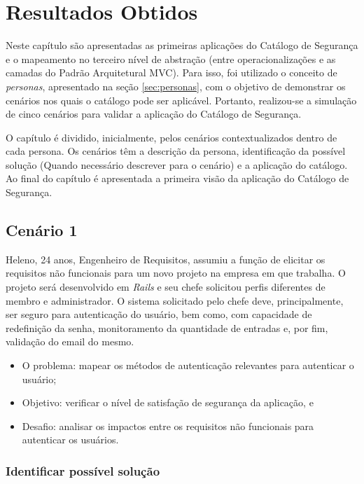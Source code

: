 \chapter{Resultados Obtidos}
\label{chap:resultadosObtidos}

Neste capítulo são apresentadas as primeiras aplicações do Catálogo de Segurança e o mapeamento no terceiro nível de abstração (entre operacionalizações e as camadas do Padrão Arquitetural MVC). Para isso, foi utilizado o conceito de \textit{personas}, apresentado na seção \ref{sec:personas}, com o objetivo de demonstrar os cenários nos quais o catálogo pode ser aplicável. Portanto, realizou-se a simulação de cinco cenários para validar a aplicação do Catálogo de Segurança. 

O capítulo é dividido, inicialmente, pelos cenários contextualizados dentro de cada persona. Os cenários têm a descrição da persona, identificação da possível solução (Quando necessário descrever para o cenário) e a aplicação do catálogo. Ao final do capítulo é apresentada a primeira visão da aplicação do Catálogo de Segurança.  


\section{Cenário 1}
\label{subsec:persona1}

Heleno, 24 anos, Engenheiro de Requisitos, assumiu a função de elicitar os requisitos não funcionais para um novo projeto na empresa em que trabalha. O projeto será desenvolvido em \textit{Rails} e seu chefe solicitou perfis diferentes de membro e administrador. O sistema solicitado pelo chefe deve, principalmente, ser seguro para autenticação do usuário, bem como, com capacidade de redefinição da senha, monitoramento da quantidade de entradas e, por fim, validação do email do mesmo.

\begin{itemize}
	\item O problema: mapear os métodos de autenticação relevantes para autenticar o usuário; 
	\item Objetivo: verificar o nível de satisfação de segurança da aplicação, e
	\item Desafio: analisar os impactos entre os requisitos não funcionais para autenticar os usuários.
\end{itemize}


\subsection{Identificar possível solução}

